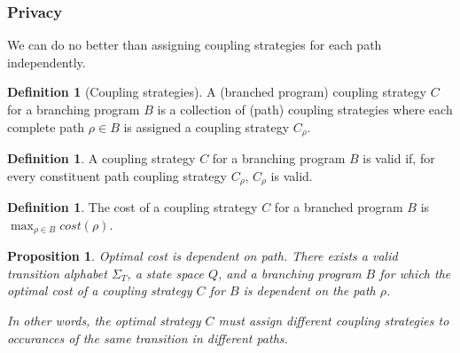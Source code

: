 \documentclass[12pt]{article}
\newtheorem{prop}[thm]{Proposition}
\theoremstyle{definition}
\newtheorem{defn}[thm]{Definition}
\begin{document}
\subsubsection{Privacy}

We can do no better than assigning coupling strategies for each path independently. 
\begin{defn}[Coupling strategies]
    A (branched program) coupling strategy $C$ for a branching program $B$ is a collection of (path) coupling strategies where each complete path $\rho\in B$ is assigned a coupling strategy $C_\rho$. 
\end{defn}

\begin{defn}
    A coupling strategy $C$ for a branching program $B$ is valid if, for every constituent path coupling strategy $C_\rho$, $C_\rho$ is valid. 
\end{defn}

\begin{defn}
    The cost of a coupling strategy $C$ for a branched program $B$ is $\max_{\rho\in B}cost(\rho)$.
\end{defn}

\begin{prop}\label{costDependspathProp}
    Optimal cost is dependent on path. There exists a valid transition alphabet $\Sigma_T$, a state space $Q$, and a branching program $B$ for which the optimal cost of a coupling strategy $C$ for $B$ is dependent on the path $\rho$. 
    
    In other words, the optimal strategy $C$ must assign different coupling strategies to occurances of the same transition in different paths. 
\end{prop}
\end{document}
